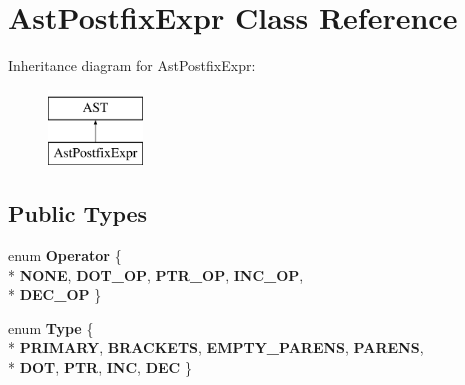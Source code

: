 \hypertarget{classAstPostfixExpr}{\section{Ast\-Postfix\-Expr Class Reference}
\label{classAstPostfixExpr}
}
Inheritance diagram for Ast\-Postfix\-Expr\-:\begin{figure}[H]
\begin{center}
\leavevmode
\includegraphics[height=2.000000cm]{classAstPostfixExpr}
\end{center}
\end{figure}
\subsection*{Public Types}
\begin{DoxyCompactItemize}
\item 
enum {\bfseries Operator} \{ \\*
{\bfseries N\-O\-N\-E}, 
{\bfseries D\-O\-T\-\_\-\-O\-P}, 
{\bfseries P\-T\-R\-\_\-\-O\-P}, 
{\bfseries I\-N\-C\-\_\-\-O\-P}, 
\\*
{\bfseries D\-E\-C\-\_\-\-O\-P}
 \}
\item 
enum {\bfseries Type} \{ \\*
{\bfseries P\-R\-I\-M\-A\-R\-Y}, 
{\bfseries B\-R\-A\-C\-K\-E\-T\-S}, 
{\bfseries E\-M\-P\-T\-Y\-\_\-\-P\-A\-R\-E\-N\-S}, 
{\bfseries P\-A\-R\-E\-N\-S}, 
\\*
{\bfseries D\-O\-T}, 
{\bfseries P\-T\-R}, 
{\bfseries I\-N\-C}, 
{\bfseries D\-E\-C}
 \}
\end{DoxyCompactItemize}
